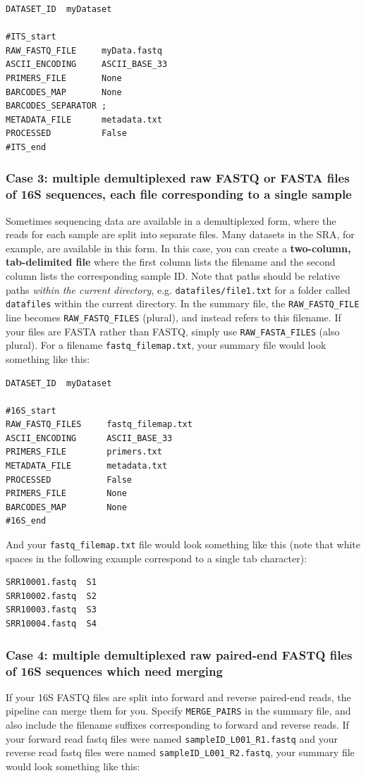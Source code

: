 \documentclass[11pt, oneside]{article}   	%
\begin{document}
\begin{verbatim}
DATASET_ID	myDataset

#ITS_start
RAW_FASTQ_FILE     myData.fastq
ASCII_ENCODING     ASCII_BASE_33
PRIMERS_FILE       None
BARCODES_MAP       None
BARCODES_SEPARATOR ;
METADATA_FILE      metadata.txt
PROCESSED          False
#ITS_end
\end{verbatim}
		
\subsubsection{Case 3: multiple demultiplexed raw FASTQ or FASTA files of 16S sequences, each file corresponding to a single sample}

Sometimes sequencing data are available in a demultiplexed form, where the reads for each sample are split into separate files.  Many datasets in the SRA, for example, are available in this form.  In this case, you can create a \textbf{two-column, tab-delimited file} where the first column lists the filename and the second column lists the corresponding sample ID.  Note that paths should be relative paths \textit{within the current directory}, e.g. {\tt datafiles/file1.txt} for a folder called {\tt datafiles} within the current directory.  In the summary file, the {\tt RAW\_FASTQ\_FILE} line becomes {\tt RAW\_FASTQ\_FILES} (plural), and instead refers to this filename.  If your files are FASTA rather than FASTQ, simply use {\tt RAW\_FASTA\_FILES} (also plural).  For a filename {\tt fastq\_filemap.txt}, your summary file would look something like this:

\begin{verbatim}
DATASET_ID	myDataset

#16S_start
RAW_FASTQ_FILES     fastq_filemap.txt
ASCII_ENCODING      ASCII_BASE_33
PRIMERS_FILE        primers.txt
METADATA_FILE       metadata.txt
PROCESSED           False
PRIMERS_FILE        None
BARCODES_MAP        None
#16S_end
\end{verbatim}

And your {\tt fastq\_filemap.txt} file would look something like this (note that white spaces in the following example correspond to a single tab character):

\begin{verbatim}
SRR10001.fastq	S1
SRR10002.fastq	S2
SRR10003.fastq	S3
SRR10004.fastq	S4
\end{verbatim}

\subsubsection{Case 4: multiple demultiplexed raw paired-end FASTQ files of 16S sequences which need merging}\label{sec:case4}
If your 16S FASTQ files are split into forward and reverse paired-end reads, the pipeline can merge them for you. Specify {\tt MERGE\_PAIRS} in the summary file, and also include the filename suffixes corresponding to forward and reverse reads. If your forward read fastq files were named {\tt sampleID\_L001\_R1.fastq} and your reverse read fastq files were named {\tt sampleID\_L001\_R2.fastq}, your summary file would look something like this:
\end{document}
